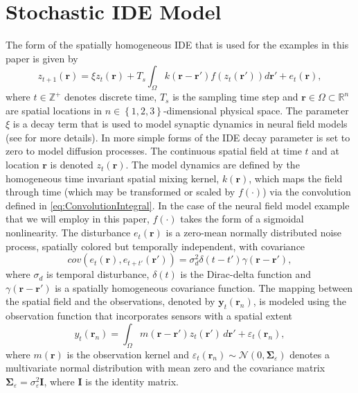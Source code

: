 \documentclass[10pt,twocolumn,twoside]{IEEEtran}
\begin{document}
\section{Stochastic IDE Model}
The form of the spatially homogeneous IDE that is used for the examples in this paper is given by 
\begin{equation}
 z_{t+1}\left(\mathbf{r}\right)=\xi z_t(\mathbf{r})+T_s\int_{\Omega}k\left(\mathbf{r}-\mathbf{r}'\right)f(z_{t}\left(\mathbf{r}'\right))d\mathbf{r}'+e_{t}\left(\mathbf{r}\right),
\label{eq:ConvolutionIntegral}
\end{equation}
where $t\in \mathbb{Z}^{+} $ denotes discrete time, $T_s$ is the sampling time step and $\mathbf{r} \in \Omega \subset \mathbb{R}^{n}$ are spatial locations in $n \in \left\lbrace 1,2,3 \right\rbrace $-dimensional physical space. The parameter $\xi$ is a decay term that is used to model synaptic dynamics in neural field models (see \cite{Freestone2011} for more details). In more simple forms of the IDE decay parameter is set to zero to model diffusion processes. The continuous spatial field at time $t$ and at location $\mathbf r$ is denoted $z_t\left(\mathbf r\right)$. The model dynamics are defined by the homogeneous time invariant spatial mixing kernel, $k\left(\mathbf{r}\right)$, which maps the field through time (which may be transformed or scaled by $f(\cdot)$) via the convolution defined in \eqref{eq:ConvolutionIntegral}. In the case of the neural field model example that we will employ in this paper, $f(\cdot)$ takes the form of a sigmoidal nonlinearity. The disturbance $e_{t}(\mathbf{r})$ is a zero-mean normally distributed noise process, spatially colored but temporally independent, with covariance \cite{Rasmussen2005}
\begin{equation}
cov\left(e_{t}\left(\mathbf{r}\right),e_{t+t'}\left(\mathbf{r'}\right)\right)=\sigma_d^2\delta(t-t')\gamma(\mathbf{r}-\mathbf{r'}),
\label{eq:FieldDisturbance}
\end{equation}
where $\sigma_d$ is temporal disturbance, $\delta(t)$ is the Dirac-delta function and $\gamma(\mathbf{r}-\mathbf{r'})$ is a spatially homogeneous covariance function. The mapping between the spatial field and the observations, denoted by $\mathbf{y}_t(\mathbf{r}_n)$, is modeled using the observation function that incorporates sensors with a spatial extent
\begin{equation}\label{eq:ObservationEquation}
	y_t(\mathbf{r}_n) = \int_{\Omega} { m\left(\mathbf{r}-\mathbf{r}'\right) z_t\left(\mathbf{r}'\right) \, d\mathbf{r}'} + \varepsilon_t(\mathbf{r}_n), 
\end{equation}
where $m\left(\mathbf{r}\right)$ is the observation kernel and $\varepsilon_t(\mathbf{r}_n) \sim \mathcal{N}\left(0,\boldsymbol{\Sigma}_{\varepsilon}\right)$ denotes a multivariate normal distribution with mean zero and the covariance matrix $\boldsymbol{\Sigma}_{\varepsilon} = \sigma_{\varepsilon}^2\mathbf{I}$, where $\mathbf{I}$ is the identity matrix.
\end{document}
